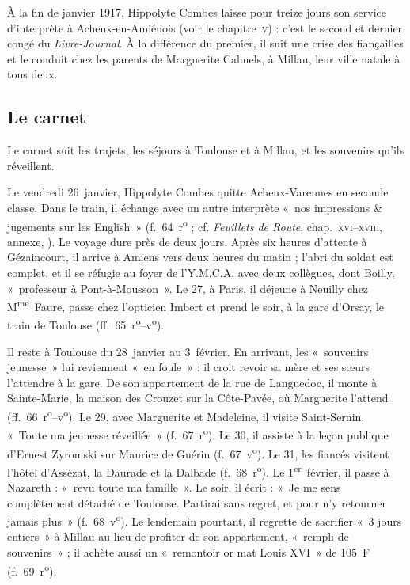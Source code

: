 
À la fin de janvier 1917, Hippolyte Combes laisse pour treize jours son service d'interprète à Acheux-en-Amiénois (voir le chapitre~\textsc{v}) : c'est le second et dernier congé du \textit{Livre-Journal}. À la différence du premier, il suit une crise des fiançailles et le conduit chez les parents de Marguerite Calmels, à Millau, leur ville natale à tous deux.

\subsection*{Le carnet}

Le carnet suit les trajets, les séjours à Toulouse et à Millau, et les souvenirs qu'ils réveillent.

Le vendredi 26~janvier, Hippolyte Combes quitte Acheux-Varennes en seconde classe. Dans le train, il échange avec un autre interprète «~nos impressions \& jugements sur les English~» (f.~64~r\textsuperscript{o} ; cf. \textit{Feuillets de Route}, chap.~\textsc{xvi}--\textsc{xviii}, annexe, ). Le voyage dure près de deux jours. Après six heures d'attente à Gézaincourt, il arrive à Amiens vers deux heures du matin ; l'abri du soldat est complet, et il se réfugie au foyer de l'Y.M.C.A. avec deux collègues, dont Boilly, «~professeur à Pont-à-Mousson~». Le 27, à Paris, il déjeune à Neuilly chez M\textsuperscript{me}~Faure, passe chez l'opticien Imbert et prend le soir, à la gare d'Orsay, le train de Toulouse (ff.~65~r\textsuperscript{o}--v\textsuperscript{o}).

Il reste à Toulouse du 28~janvier au 3~février. En arrivant, les «~souvenirs jeunesse~» lui reviennent «~en foule~» : il croit revoir sa mère et ses sœurs l'attendre à la gare. De son appartement de la rue de Languedoc, il monte à Sainte-Marie, la maison des Crouzet sur la Côte-Pavée, où Marguerite l'attend (ff.~66~r\textsuperscript{o}--v\textsuperscript{o}). Le 29, avec Marguerite et Madeleine, il visite Saint-Sernin, «~Toute ma jeunesse réveillée~» (f.~67~r\textsuperscript{o}). Le 30, il assiste à la leçon publique d'Ernest Zyromski sur Maurice de Guérin (f.~67~v\textsuperscript{o}). Le 31, les fiancés visitent l'hôtel d'Assézat, la Daurade et la Dalbade (f.~68~r\textsuperscript{o}). Le 1\textsuperscript{er}~février, il passe à Nazareth : «~revu toute ma famille~». Le soir, il écrit : «~Je me sens complètement détaché de Toulouse. Partirai sans regret, et pour n'y retourner jamais plus~» (f.~68~v\textsuperscript{o}). Le lendemain pourtant, il regrette de sacrifier «~3 jours entiers~» à Millau au lieu de profiter de son appartement, «~rempli de souvenirs~» ; il achète aussi un «~remontoir or mat Louis XVI~» de 105~F (f.~69~r\textsuperscript{o}).


